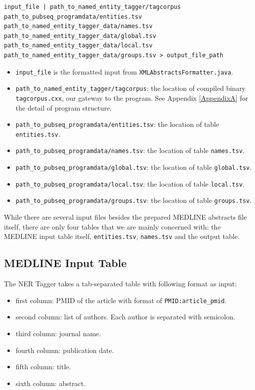\begin{lstlisting}[breaklines]
input_file | path_to_named_entity_tagger/tagcorpus path_to_pubseq_programdata/entities.tsv path_to_named_entity_tagger_data/names.tsv path_to_named_entity_tagger_data/global.tsv path_to_named_entity_tagger_data/local.tsv path_to_named_entity_tagger_data/groups.tsv > output_file_path
\end{lstlisting}

\begin{itemize}
\item \texttt{input\_file} is the formatted input from \texttt{XMLAbstractsFormatter.java}.
\item \texttt{path\_to\_named\_entity\_tagger/tagcorpus}: the location of compiled binary \texttt{tagcorpus.cxx}, our gateway to the program. See Appendix \ref{AppendixA} for the detail of program structure.
\item \texttt{path\_to\_pubseq\_programdata/entities.tsv}: the location of table \texttt{entities.tsv}.
\item \texttt{path\_to\_pubseq\_programdata/names.tsv}: the location of table \texttt{names.tsv}.
\item \texttt{path\_to\_pubseq\_programdata/global.tsv}: the location of table \texttt{global.tsv}.
\item \texttt{path\_to\_pubseq\_programdata/local.tsv}: the location of table \texttt{local.tsv}.
\item \texttt{path\_to\_pubseq\_programdata/groups.tsv}: the location of table \texttt{groups.tsv}.
\end{itemize}

While there are several input files besides the prepared MEDLINE abstracts file itself, there are only four tables that we are mainly concerned with: the MEDLINE input table itself, \texttt{entities.tsv}, \texttt{names.tsv} and the output table.

\subsection{MEDLINE Input Table}

The NER Tagger takes a tab-separated table with following format as input:

\begin{itemize}
\item first column: PMID of the article with format of \texttt{PMID:article\_pmid}.
\item second column: list of authors. Each author is separated with semicolon.
\item third column: journal name.
\item fourth column: publication date.
\item fifth column: title.
\item sixth column: abstract.
\end{itemize}

